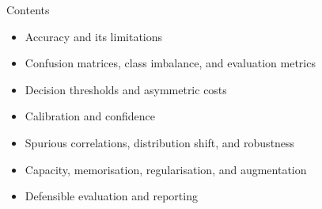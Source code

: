 \newcommand{\lecturetitle}{Basic Machine Learning II}
\newcommand{\lecturesubtitle}{Trusting the predictions}
\newcommand{\covertext}{Basic Machine\\Learning II}



\begin{frame}{Contents}
\begin{itemize}
  \item Accuracy and its limitations
  \item Confusion matrices, class imbalance, and evaluation metrics
  \item Decision thresholds and asymmetric costs
  \item Calibration and confidence
  \item Spurious correlations, distribution shift, and robustness
  \item Capacity, memorisation, regularisation, and augmentation
  \item Defensible evaluation and reporting
\end{itemize}
\end{frame}


